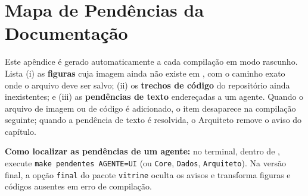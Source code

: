 \chapter{Mapa de Pendências da Documentação}\label{ap:pendencias}

Este apêndice é gerado automaticamente a cada compilação em modo rascunho. Lista (i) as \textbf{figuras} cuja imagem ainda não existe em , com o caminho exato onde o arquivo deve ser salvo; (ii) os \textbf{trechos de código} do repositório ainda inexistentes; e (iii) as \textbf{pendências de texto} endereçadas a um agente. Quando o arquivo de imagem ou de código é adicionado, o item desaparece na compilação seguinte; quando a pendência de texto é resolvida, o Arquiteto remove o aviso do capítulo.

\textbf{Como localizar as pendências de um agente:} no terminal, dentro de , execute \texttt{make pendentes AGENTE=UI} (ou \texttt{Core}, \texttt{Dados}, \texttt{Arquiteto}). Na versão final, a opção \texttt{final} do pacote \texttt{vitrine} oculta os avisos e transforma figuras e códigos ausentes em erro de compilação.

\vitrineimprimirpendencias

